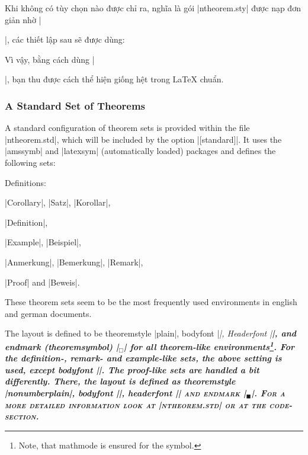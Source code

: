 \documentclass[11pt,oneside]{ltxdoc}
\theoremstyle{marginbreak}
\theoremstyle{changebreak}
\theoremstyle{change}
\theoremstyle{plain}
\theoremstyle{nonumberplain}
\begin{document}
Khi không có tùy chọn nào được chỉ ra, nghĩa là gói |ntheorem.sty|
được nạp đơn giản nhờ |\usepackage{ntheorem}|, các thiết lập sau
sẽ được dùng:
\begin{example} 
  \theoremstyle{plain}
  \theoremheaderfont{\normalfont\bfseries}
  \theorembodyfont{\itshape}
  \theoremseparator{}
  \theoremsymbol{}
\end{example}
Vì vậy, bằng cách dùng |\newtheorem{...}{...}|, bạn thu được
cách thể hiện giống hệt trong \LaTeX{} chuẩn.

\subsubsection{A Standard Set of Theorems}\label{sec:standard}

A standard configuration of theorem sets is provided within
the file |ntheorem.std|, which will be included by the option
|[standard]|. It uses the |amssymb| and |latexsym| (automatically
loaded) packages and defines the following sets:
\begin{nlist}{Definitions:}
 \item[Theorems:] %
  |Corollary|, |Satz|, |Korollar|,
 \item[Definitions:] |Definition|,
 \item[Examples:] |Example|, |Beispiel|,
 \item[Remarks:] |Anmerkung|, |Bemerkung|, |Remark|,
 \item[Proofs:] |Proof| and |Beweis|.
\end{nlist}
These theorem sets seem to be the most frequently used environments 
in english and german
documents.

The layout is defined to be theoremstyle |plain|, bodyfont |\itshape|,
Headerfont |\bfseries|, and endmark (theoremsymbol)
|\ensuremath{_\Box}| for all theorem-like environments\footnote{Note, 
that mathmode is ensured for the symbol.}.
For the definition-, remark- and example-like sets,
the above setting is used, except bodyfont |\upshape|.
The proof-like sets are handled a bit differently. There, the layout 
is defined as theoremstyle |nonumberplain|, bodyfont |\upshape|,
headerfont |\scshape| and endmark |\ensuremath{_\blacksquare}|. 
For a more detailed information look at 
|ntheorem.std| or at the code-section.
\end{document}
